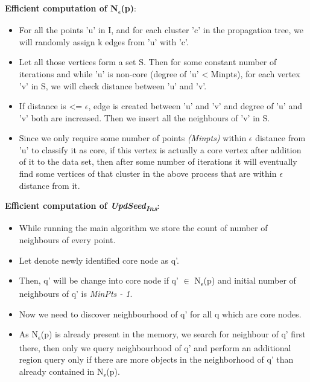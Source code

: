 \documentclass[acmsmall]{acmart}
\begin{document}
\begin{enumerate}
\begin{itemize}
        \textbf{Efficient computation of N\textsubscript{$\epsilon$}(p)}:
        \begin{itemize}
            \item For all the points 'u' in I, and for each cluster 'c' in the propagation tree, we will randomly assign k edges from 'u' with 'c'. 
            \item Let all those vertices form a set S. Then for some constant number of iterations and while 'u' is non-core (degree of 'u' < Minpts), for each vertex 'v' in S, we will check distance between 'u' and 'v'. 
            \item If distance is <= $\epsilon$, edge is created between 'u' and 'v' and degree of 'u' and 'v' both are increased. Then we insert all the neighbours of 'v' in S. 
    
            \item Since we only require some number of points \textit{(Minpts)} within $\epsilon$ distance from 'u' to classify it as core, if this vertex is actually a core vertex after addition of it to the data set, then after some number of iterations it will eventually find some vertices of that cluster in the above process that are within $\epsilon$ distance from it. \\
        \end{itemize} 
     
        \textbf{Efficient computation of \textit{UpdSeed\textsubscript{Ins}}}:
        \begin{itemize}
            \item While running the main algorithm we store the count of number of neighbours of every point.
            \item Let denote newly identified core node as q'.
            
            \item Then, q' will be change into core node if q' $\in$ N\textsubscript{$\epsilon$}(p) and initial number of neighbours of  q' is \textit{MinPts - 1}.
            
            \item Now we need to discover neighbourhood of q' for all q which are core nodes.
            
            \item As N\textsubscript{$\epsilon$}(p) is already present in the memory, we search for neighbour of q' first there, then only we query neighbourhood of q’ and perform an additional region query only if there are more objects in the neighborhood of q’ than already contained in N\textsubscript{$\epsilon$}(p). \\ 
        \end{itemize}
        

\end{itemize}
\end{enumerate}
\end{document}
